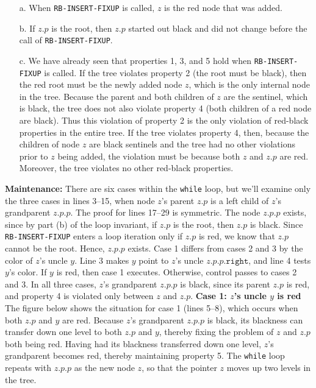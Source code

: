 \documentclass{report}
\begin{document}
\begin{enumerate}
    \item[a.] When \texttt{RB-INSERT-FIXUP} is called, $z$ is the red node that was added.
    \item[b.] If $z.p$ is the root, then $z.p$ started out black and did not change before the call of \texttt{RB-INSERT-FIXUP}.
    \item[c.] We have already seen that properties 1, 3, and 5 hold when \texttt{RB-INSERT-FIXUP} is called.
        \bigbreak \noindent 
        If the tree violates property 2 (the root must be black), then the red root must be the newly added node $z$, which is the only internal node in the tree. Because the parent and both children of $z$ are the sentinel, which is black, the tree does not also violate property 4 (both children of a red node are black). Thus this violation of property 2 is the only violation of red-black properties in the entire tree.
        \bigbreak \noindent 
        If the tree violates property 4, then, because the children of node $z$ are black sentinels and the tree had no other violations prior to $z$ being added, the violation must be because both $z$ and $z.p$ are red. Moreover, the tree violates no other red-black properties.
\end{enumerate}
\bigbreak \noindent 
\textbf{Maintenance:} There are six cases within the \texttt{while} loop, but we’ll examine only the three cases in lines 3–15, when node $z$’s parent $z.p$ is a left child of $z$’s grandparent $z.p.p$. The proof for lines 17–29 is symmetric. The node $z.p.p$ exists, since by part (b) of the loop invariant, if $z.p$ is the root, then $z.p$ is black. Since \texttt{RB-INSERT-FIXUP} enters a loop iteration only if $z.p$ is red, we know that $z.p$ cannot be the root. Hence, $z.p.p$ exists.
\bigbreak \noindent 
Case 1 differs from cases 2 and 3 by the color of $z$’s uncle $y$. Line 3 makes $y$ point to $z$’s uncle $z.p.p.\texttt{right}$, and line 4 tests $y$’s color. If $y$ is red, then case 1 executes. Otherwise, control passes to cases 2 and 3. In all three cases, $z$’s grandparent $z.p.p$ is black, since its parent $z.p$ is red, and property 4 is violated only between $z$ and $z.p$.
\bigbreak \noindent 
\textbf{Case 1: $z$'s uncle $y$ is red}
\bigbreak \noindent 
The figure below shows the situation for case 1 (lines 5–8), which occurs when both $z.p$ and $y$ are red. Because $z$’s grandparent $z.p.p$ is black, its blackness can transfer down one level to both $z.p$ and $y$, thereby fixing the problem of $z$ and $z.p$ both being red. Having had its blackness transferred down one level, $z$’s grandparent becomes red, thereby maintaining property 5. The \texttt{while} loop repeats with $z.p.p$ as the new node $z$, so that the pointer $z$ moves up two levels in the tree.
\bigbreak \noindent 
{}
\end{document}
